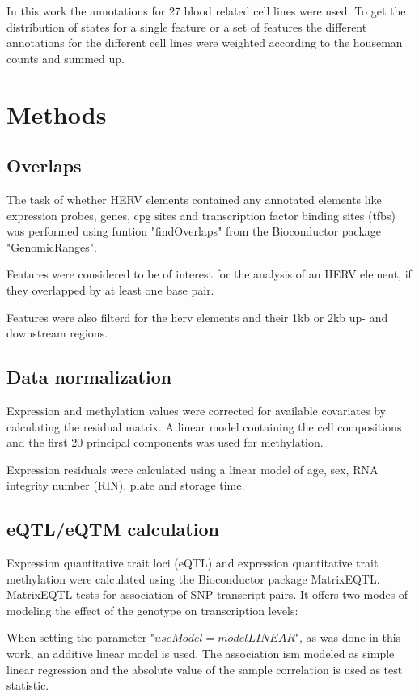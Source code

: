 \documentclass[a4paper,12pt]{article}
\begin{document}
In this work the annotations for 27 blood related cell lines were used. To get the distribution of states for a single feature or a set of features the different annotations for the different cell lines were weighted according to the houseman counts and summed up.

\section{Methods}
\subsection{Overlaps}
The task of whether HERV elements contained any annotated elements like expression probes, genes, cpg sites and transcription factor binding sites (tfbs) was performed using funtion "findOverlaps" from the Bioconductor package "GenomicRanges"\cite{10.1371/journal.pcbi.1003118}. 

Features were considered to be of interest for the analysis of an HERV element, if they overlapped by at least one base pair.

Features were also filterd for the herv elements and their 1kb or 2kb up- and downstream regions.

\subsection{Data normalization}
Expression and methylation values were corrected for available covariates by calculating the residual matrix. 
A linear model containing the cell compositions and the first 20 principal components was used for methylation.

Expression residuals were calculated using a linear model of age, sex, RNA integrity number (RIN), plate and storage time. 

\subsection{eQTL/eQTM calculation}
Expression quantitative trait loci (eQTL) and expression quantitative trait methylation were calculated using the Bioconductor package MatrixEQTL\cite{10.1093/bioinformatics/bts163}. MatrixEQTL tests for association of SNP-transcript pairs. It offers two modes of modeling the effect of the genotype on transcription levels: 

When setting the parameter "$useModel = modelLINEAR$", as was done in this work, an additive linear model is used. The association ism modeled as simple linear regression and the absolute value of the sample correlation is used as test statistic.
 
\end{document}
